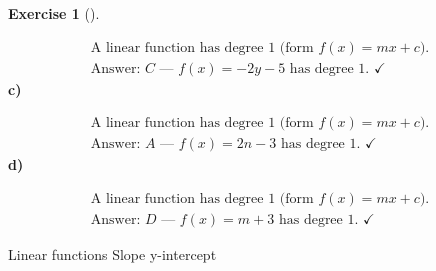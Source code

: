\documentclass[
  letterpaper,
  DIV=11,
  numbers=noendperiod]{scrreprt}
\theoremstyle{definition}
\newtheorem{exercise}{Exercise}[chapter]
\theoremstyle{remark}
\begin{document}
\begin{exercise}[]
\begin{tcolorbox}
\[
\begin{aligned}
\text{A linear function has degree 1 (form } f(x) = mx + c\text{).} \\[4pt] \text{Answer: } C \text{ — } f(x) = -2y - 5 \text{ has degree 1. }\checkmark
\end{aligned}
\] \textbf{c)}

\[
\begin{aligned}
\text{A linear function has degree 1 (form } f(x) = mx + c\text{).} \\[4pt] \text{Answer: } A \text{ — } f(x) = 2n - 3 \text{ has degree 1. }\checkmark
\end{aligned}
\] \textbf{d)}

\[
\begin{aligned}
\text{A linear function has degree 1 (form } f(x) = mx + c\text{).} \\[4pt] \text{Answer: } D \text{ — } f(x) = m + 3 \text{ has degree 1. }\checkmark
\end{aligned}
\]

\end{tcolorbox}

{Linear functions} {Slope} {y-intercept}

\end{exercise}
\end{document}

